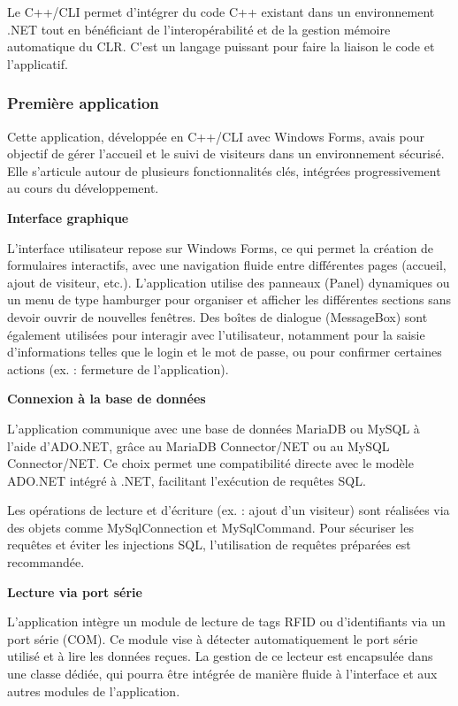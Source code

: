 \documentclass[main.tex]{subfiles}
\begin{document}
Le C++/CLI permet d'intégrer du code C++ existant dans un environnement .NET tout en bénéficiant de l'interopérabilité et de la gestion mémoire automatique du CLR. C'est un langage puissant pour faire la liaison le code et l'applicatif.

\subsubsection{Première application}

Cette application, développée en C++/CLI avec Windows Forms, avais pour objectif de gérer l’accueil et le suivi de visiteurs dans un environnement sécurisé. Elle s’articule autour de plusieurs fonctionnalités clés, intégrées progressivement au cours du développement.

\textbf{Interface graphique}

L’interface utilisateur repose sur Windows Forms, ce qui permet la création de formulaires interactifs, avec une navigation fluide entre différentes pages (accueil, ajout de visiteur, etc.). L’application utilise des panneaux (Panel) dynamiques ou un menu de type hamburger pour organiser et afficher les différentes sections sans devoir ouvrir de nouvelles fenêtres. Des boîtes de dialogue (MessageBox) sont également utilisées pour interagir avec l’utilisateur, notamment pour la saisie d’informations telles que le login et le mot de passe, ou pour confirmer certaines actions (ex. : fermeture de l’application).

\textbf{Connexion à la base de données}

L’application communique avec une base de données MariaDB ou MySQL à l’aide d’ADO.NET, grâce au MariaDB Connector/NET ou au MySQL Connector/NET. Ce choix permet une compatibilité directe avec le modèle ADO.NET intégré à .NET, facilitant l’exécution de requêtes SQL.

Les opérations de lecture et d’écriture (ex. : ajout d’un visiteur) sont réalisées via des objets comme MySqlConnection et MySqlCommand. Pour sécuriser les requêtes et éviter les injections SQL, l’utilisation de requêtes préparées est recommandée.

\textbf{Lecture via port série}

L’application intègre un module de lecture de tags RFID ou d’identifiants via un port série (COM). Ce module vise à détecter automatiquement le port série utilisé et à lire les données reçues. La gestion de ce lecteur est encapsulée dans une classe dédiée, qui pourra être intégrée de manière fluide à l’interface et aux autres modules de l’application.
\end{document}
